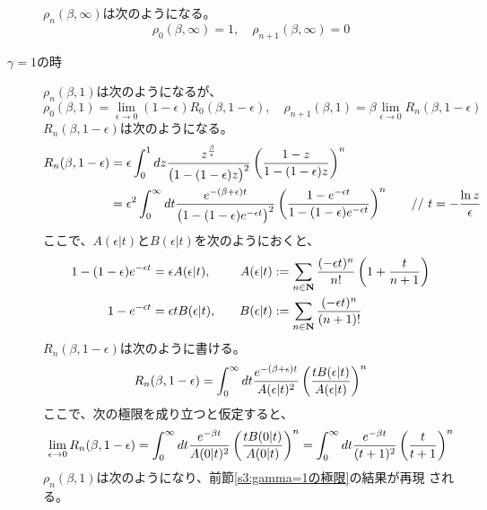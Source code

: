 \begin{description}
\begin{equation*}
	\end{equation*}
	$\rho_n(\beta,\infty)$は次のようになる。
	\begin{equation*}
		\rho_0(\beta,\infty) = 1 ,\quad \rho_{n+1}(\beta,\infty) = 0
	\end{equation*}
	\item[$\gamma=1$の時] $\rho_n(\beta,1)$は次のようになるが、
	\begin{equation*}
		\rho_0(\beta,1) = \lim_{\epsilon\to0}(1 - \epsilon)R_0(\beta,1 - \epsilon)
		,\quad \rho_{n+1}(\beta,1) = \beta\lim_{\epsilon\to0}R_n(\beta, 1 - \epsilon)
	\end{equation*}
	$R_n(\beta,1-\epsilon)$は次のようになる。
	\begin{alignat*}{2}
		R_n(\beta,1-\epsilon) &= \epsilon\int_0^1 dz
			\frac{z^{\frac{\beta}{\epsilon}}}{\mathinner{\bigl({1 - (1 - \epsilon)z}\bigr)}^2}
			\mathinner{\left({\frac{1 - z}{1 - (1 - \epsilon)z}}\right)}^n \\
		&= \epsilon^2\int_0^\infty dt \frac{e^{- (\beta + \epsilon)t}}
			{\mathinner{\bigl({1 - (1 - \epsilon)e^{- \epsilon t}}\bigr)}^2}
			\mathinner{\left({\frac{1 - e^{- \epsilon t}}
			{1 - (1 - \epsilon)e^{- \epsilon t}}}\right)}^n
			&\quad&\text{// } t = - \frac{\ln z}{\epsilon}
	\end{alignat*}
	ここで、$A(\epsilon|t)$と$B(\epsilon|t)$を次のようにおくと、
	\begin{alignat*}{2}
		1 - (1 - \epsilon)e^{- \epsilon t} &= \epsilon A(\epsilon|t)
		,&\quad A(\epsilon|t) &:= \sum_{n\in\mathbf{N}}
			\frac{(- \epsilon t)^n}{n!}\mathinner{\left({1 + \frac{t}{n + 1}}\right)} \\
		1 - e^{- \epsilon t} &= \epsilon tB(\epsilon|t) 
		,&\quad B(\epsilon|t)	&:= \sum_{n\in\mathbf{N}}
			\frac{(- \epsilon t)^n}{(n + 1)!}
	\end{alignat*}
	$R_n(\beta,1-\epsilon)$は次のように書ける。
	\begin{equation*}
		R_n(\beta,1-\epsilon) = \int_0^\infty dt 
		\frac{e^{- (\beta + \epsilon)t}}{A(\epsilon|t)^2}
		\mathinner{\left({\frac{tB(\epsilon|t)}{A(\epsilon|t)}}\right)}^n
	\end{equation*}
	ここで、次の極限を成り立つと仮定すると、
	\begin{equation*}
		\lim_{\epsilon\to0} R_n(\beta,1-\epsilon) = \int_0^\infty dt 
			\frac{e^{- \beta t}}{A(0|t)^2}\mathinner{\left({\frac{tB(0|t)}{A(0|t)}}\right)}^n
		= \int_0^\infty dt 
			\frac{e^{- \beta t}}{(t + 1)^2}\mathinner{\left({\frac{t}{t + 1}}\right)}^n
	\end{equation*}
	$\rho_n(\beta,1)$は次のようになり、前節\ref{s3:gamma=1の極限}の結果が再現
	される。
	\begin{equation*}

\end{equation*}
\end{description}
